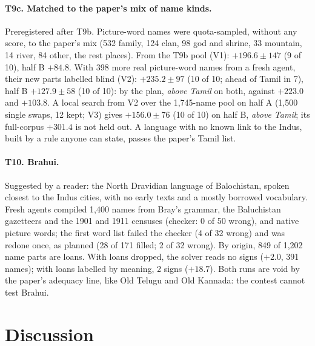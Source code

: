 \documentclass[11pt,a4paper]{article}
\begin{document}
\paragraph{T9c. Matched to the paper's mix of name kinds.} Preregistered after T9b. Picture-word names were quota-sampled, without any score, to the paper's mix (532 family, 124 clan, 98 god and shrine, 33 mountain, 14 river, 84 other, the rest places). From the T9b pool (V1): $+196.6\pm147$ (9 of 10), half B $+84.8$. With 398 more real picture-word names from a fresh agent, their new parts labelled blind (V2): $+235.2\pm97$ (10 of 10; ahead of Tamil in 7), half B $+127.9\pm58$ (10 of 10): by the plan, \emph{above Tamil} on both, against $+223.0$ and $+103.8$. A local search from V2 over the 1,745-name pool on half A (1,500 single swaps, 12 kept; V3) gives $+156.0\pm76$ (10 of 10) on half B, \emph{above Tamil}; its full-corpus $+301.4$ is not held out. A language with no known link to the Indus, built by a rule anyone can state, passes the paper's Tamil list.

\paragraph{T10. Brahui.} Suggested by a reader: the North Dravidian language of Balochistan, spoken closest to the Indus cities, with no early texts and a mostly borrowed vocabulary. Fresh agents compiled 1,400 names from Bray's grammar, the Baluchistan gazetteers and the 1901 and 1911 censuses (checker: 0 of 50 wrong), and native picture words; the first word list failed the checker (4 of 32 wrong) and was redone once, as planned (28 of 171 filled; 2 of 32 wrong). By origin, 849 of 1,202 name parts are loans. With loans dropped, the solver reads no signs ($+2.0$, 391 names); with loans labelled by meaning, 2 signs ($+18.7$). Both runs are void by the paper's adequacy line, like Old Telugu and Old Kannada: the contest cannot test Brahui.

\section{Discussion}\label{sec:discussion}
\end{document}
